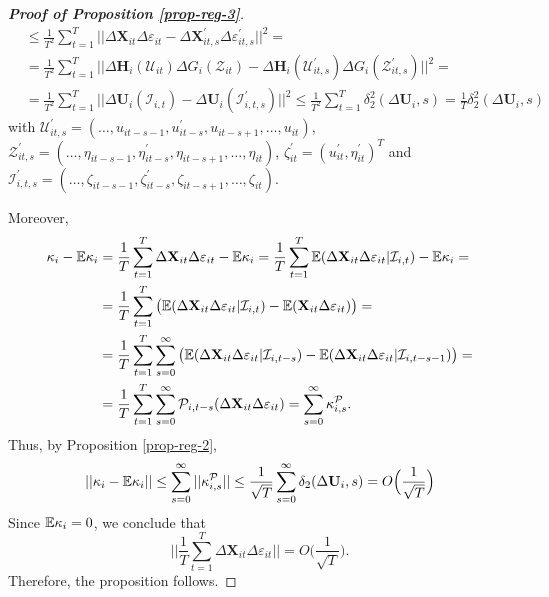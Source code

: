 \documentclass[a4paper,12pt]{article}
\begin{document}
\begin{proof}[\textnormal{\textbf{Proof of Proposition \ref{prop-reg-3}}}]
\begin{align*}
&\leq \frac{1}{T^2} \sum_{t=1}^T \Big|\Big| \Delta \mathbf{X}_{it}\Delta \varepsilon_{it} -\Delta \mathbf{X}_{it, s}^\prime\Delta \varepsilon_{it, s}^\prime\Big|\Big|^2 =\\
& = \frac{1}{T^2} \sum_{t=1}^T \Big|\Big| \Delta \mathbf{H}_i(\mathcal{U}_{it})  \Delta G_i(\mathcal{Z}_{it}) - \Delta \mathbf{H}_i(\mathcal{U}_{it, s}^\prime)  \Delta G_i(\mathcal{Z}_{it, s}^\prime)\Big|\Big|^2 =\\
& = \frac{1}{T^2} \sum_{t=1}^T \Big|\Big| \Delta \mathbf{U}_i(\mathcal{I}_{i,t})  - \Delta \mathbf{U}_i(\mathcal{I}_{i,t, s}^\prime) \Big|\Big|^2 \leq \frac{1}{T^2} \sum_{t=1}^T \delta_2^2(\Delta \mathbf{U}_i, s) = \frac{1}{T}\delta_2^2(\Delta \mathbf{U}_i, s)
\end{align*}
with $\mathcal{U}_{it, s}^\prime = (\ldots, u_{it-s-1}, u^\prime_{it-s}, u_{it-s+1}, \ldots, u_{it})$, $\mathcal{Z}_{it, s}^\prime = (\ldots, \eta_{it-s-1}, \eta^\prime_{it-s}, \eta_{it-s+1}, \ldots, \eta_{it})$, $\zeta^\prime_{it} = (u_{it}^\prime, \eta_{it}^\prime)^T$ and $\mathcal{I}_{i,t,s}^\prime =(\ldots, \zeta_{it-s-1}, \zeta^\prime_{it-s}, \zeta_{it-s+1}, \ldots, \zeta_{it})$.

Moreover,
\begin{align*}
\kappa_i - \mathbb{E} \kappa_i &= \frac{1}{T}\sum_{t=1}^T \Delta \mathbf{X}_{it}\Delta \varepsilon_{it} - \mathbb{E} \kappa_i = \frac{1}{T}\sum_{t=1}^T \mathbb{E} ( \Delta \mathbf{X}_{it}\Delta \varepsilon_{it}|\mathcal{I}_{i,t}) - \mathbb{E} \kappa_i =\\
&= \frac{1}{T}\sum_{t=1}^T \big( \mathbb{E} ( \Delta \mathbf{X}_{it}\Delta \varepsilon_{it}|\mathcal{I}_{i,t} ) - \mathbb{E} ( \mathbf{X}_{it}\Delta \varepsilon_{it}) \big) = \\
&= \frac{1}{T}\sum_{t=1}^T \sum_{s=0}^\infty \big( \mathbb{E} ( \Delta \mathbf{X}_{it}\Delta \varepsilon_{it}|\mathcal{I}_{i,t-s} ) - \mathbb{E} ( \Delta \mathbf{X}_{it}\Delta \varepsilon_{it}|\mathcal{I}_{i,t-s-1} )  \big) =\\
&= \frac{1}{T}\sum_{t=1}^T \sum_{s=0}^\infty \mathcal{P}_{i, t-s} (\Delta \mathbf{X}_{it}\Delta \varepsilon_{it}) = \sum_{s=0}^\infty \kappa_{i, s}^{\mathcal{P}}.
\end{align*}
Thus, by Proposition \ref{prop-reg-2},
\[ || \kappa_i - \mathbb{E} \kappa_i || \leq \sum_{s=0}^\infty ||\kappa_{i, s}^{\mathcal{P}} || \leq \frac{1}{\sqrt{T}}\sum_{s=0}^\infty \delta_2(\Delta \mathbf{U}_i, s) = O\Big(\frac{1}{\sqrt{T}}\Big)
\]
Since $\mathbb{E} \kappa_i = 0$, we conclude that
\[  \Big|\Big| \frac{1}{T}\sum_{t=1}^T  \Delta \mathbf{X}_{it}\Delta \varepsilon_{it} \Big|\Big| = O\Big(\frac{1}{\sqrt{T}}\Big).
\]
Therefore, the proposition follows.
\end{proof}
\end{document}
